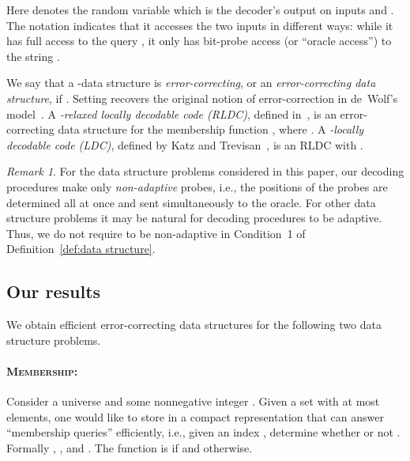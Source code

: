\documentclass[11pt,english]{article}
\newcommand{\noun}[1]{\textsc{#1}}
\theoremstyle{definition}
\theoremstyle{remark}
\newtheorem*{rem}{Remark}
\begin{document}
Here  denotes the random variable which is the decoder's output on inputs  and .
The notation indicates that it accesses the two inputs in different ways: 
while it has full access to the query , it only has bit-probe access (or ``oracle access'') to the string .

We say that a -data structure is \emph{error-correcting},
or an \emph{error-correcting data structure}, if . 
Setting  recovers the original notion of error-correction
in de~Wolf's model~\cite{wolf:ecdata}. A \emph{-relaxed locally
decodable code (RLDC)}, defined in~\cite{bghsv04}, is an error-correcting
data structure for the membership function ,
where . A \emph{-locally decodable code (LDC)}, defined
by Katz and Trevisan~\cite{katz&trevisan:ldc}, is an RLDC with .

\begin{rem}For the data structure problems considered in this paper,
our decoding procedures make only \emph{non-adaptive} probes, i.e.,
the positions of the probes are determined all at once and sent simultaneously
to the oracle. For other data structure problems it may be natural
for decoding procedures to be adaptive. Thus, we do not require 
to be non-adaptive in Condition~1 of Definition~\ref{def:data structure}.\end{rem}


\subsection{Our results\label{sub:Our results}}

We obtain efficient error-correcting data structures for the following two data structure problems.

\paragraph{\textbf{\noun{Membership:}}}

Consider a universe  and some nonnegative integer
. Given a set  with at most  elements,
one would like to store  in a compact representation that can
answer ``membership queries'' efficiently, i.e., given an index
, determine whether or not . Formally ,
, and . The function  is 
if  and  otherwise.
\end{document}
